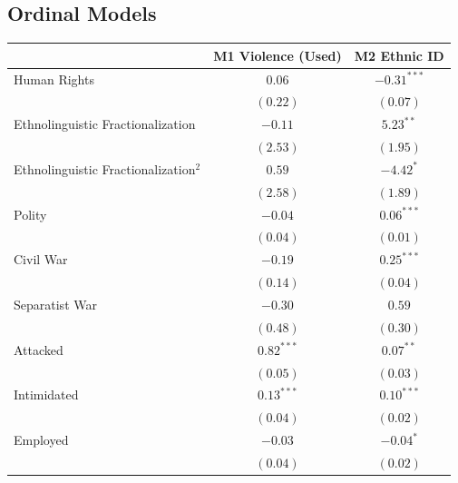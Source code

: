 \documentclass[12pt,]{book}
\let\origtable\table
\let\endorigtable\endtable
\renewenvironment{table}[1][2] {
    \singlespacing
    \expandafter\origtable\expandafter[H]
} {
    \endorigtable
}
\theoremstyle{definition}
\theoremstyle{definition}
\theoremstyle{definition}
\theoremstyle{remark}
\begin{document}
\hypertarget{ordinal-models}{%
\subsection*{Ordinal Models}\label{ordinal-models}}

\begin{table}
\begin{center}
\begin{tabular}{l c c }
\hline
 & M1 Violence (Used) & M2 Ethnic ID \\
\hline
Human Rights                            & $0.06$        & $-0.31^{***}$ \\
                                        & $(0.22)$      & $(0.07)$      \\
Ethnolinguistic Fractionalization       & $-0.11$       & $5.23^{**}$   \\
                                        & $(2.53)$      & $(1.95)$      \\
Ethnolinguistic Fractionalization$^{2}$ & $0.59$        & $-4.42^{*}$   \\
                                        & $(2.58)$      & $(1.89)$      \\
Polity                                  & $-0.04$       & $0.06^{***}$  \\
                                        & $(0.04)$      & $(0.01)$      \\
Civil War                               & $-0.19$       & $0.25^{***}$  \\
                                        & $(0.14)$      & $(0.04)$      \\
Separatist War                          & $-0.30$       & $0.59$        \\
                                        & $(0.48)$      & $(0.30)$      \\
Attacked                                & $0.82^{***}$  & $0.07^{**}$   \\
                                        & $(0.05)$      & $(0.03)$      \\
Intimidated                             & $0.13^{***}$  & $0.10^{***}$  \\
                                        & $(0.04)$      & $(0.02)$      \\
Employed                                & $-0.03$       & $-0.04^{*}$   \\
                                        & $(0.04)$      & $(0.02)$      \\

\end{tabular}
\end{center}
\end{table}
\end{document}
